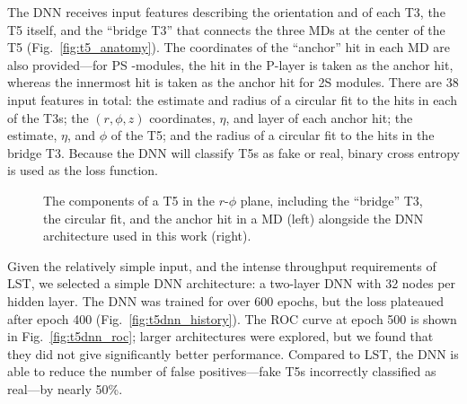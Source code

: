 The DNN receives input features describing the orientation and \pt of each T3, the T5 itself, and the ``bridge T3'' that connects the three MDs at the center of the T5 (Fig.~\ref{fig:t5_anatomy}). 
The coordinates of the ``anchor'' hit in each MD are also provided---for PS \pt-modules, the hit in the P-layer is taken as the anchor hit, whereas the innermost hit is taken as the anchor hit for 2S modules. 
There are 38 input features in total: the \pt estimate and radius of a circular fit to the hits in each of the T3s; 
the $(r, \phi, z)$ coordinates, $\eta$, and layer of each anchor hit; 
the \pt estimate, $\eta$, and $\phi$ of the T5; 
and the radius of a circular fit to the hits in the bridge T3. 
Because the DNN will classify T5s as fake or real, binary cross entropy is used as the loss function. 

\begin{figure}[!htb]
    \centering
    \qquad
    \caption{
        The components of a T5 in the $r$-$\phi$ plane, including the ``bridge'' T3, the circular fit, and the anchor hit in a MD (left) alongside the DNN architecture used in this work (right). 
    }
\end{figure}

Given the relatively simple input, and the intense throughput requirements of LST, we selected a simple DNN architecture: a two-layer DNN with 32 nodes per hidden layer. 
The DNN was trained for over 600 epochs, but the loss plateaued after epoch 400 (Fig.~\ref{fig:t5dnn_history}). 
The ROC curve at epoch 500 is shown in Fig.~\ref{fig:t5dnn_roc}; larger architectures were explored, but we found that they did not give significantly better performance. 
Compared to LST, the DNN is able to reduce the number of false positives---fake T5s incorrectly classified as real---by nearly 50\%. 


